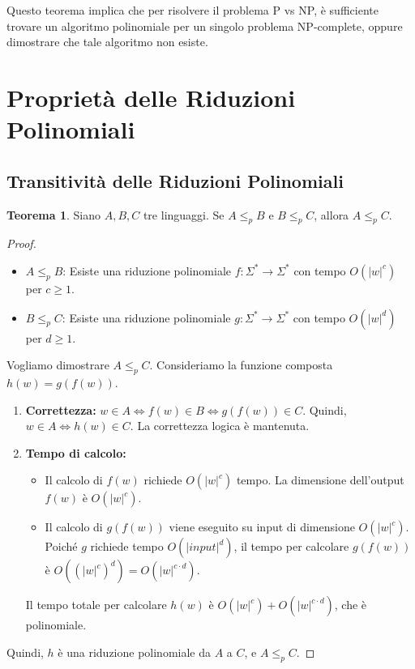 \documentclass[a4paper]{article}
\theoremstyle{definition} %
\newtheorem{theorem}{Teorema}
\begin{document}
Questo teorema implica che per risolvere il problema P vs NP, è sufficiente trovare un algoritmo polinomiale per un singolo problema NP-complete, oppure dimostrare che tale algoritmo non esiste.

\section{Proprietà delle Riduzioni Polinomiali}

\subsection{Transitivit\`a delle Riduzioni Polinomiali}

\begin{theorem}
Siano $A, B, C$ tre linguaggi. Se $A \le_p B$ e $B \le_p C$, allora $A \le_p C$.
\end{theorem}

\begin{proof}
\begin{itemize}
    \item $A \le_p B$: Esiste una riduzione polinomiale $f: \Sigma^* \to \Sigma^*$ con tempo $O(|w|^c)$ per $c \ge 1$.
    \item $B \le_p C$: Esiste una riduzione polinomiale $g: \Sigma^* \to \Sigma^*$ con tempo $O(|w|^d)$ per $d \ge 1$.
\end{itemize}
Vogliamo dimostrare $A \le_p C$.
Consideriamo la funzione composta $h(w) = g(f(w))$.
\begin{enumerate}
    \item \textbf{Correttezza:} $w \in A \iff f(w) \in B \iff g(f(w)) \in C$. Quindi, $w \in A \iff h(w) \in C$. La correttezza logica è mantenuta.
    \item \textbf{Tempo di calcolo:}
    \begin{itemize}
        \item Il calcolo di $f(w)$ richiede $O(|w|^c)$ tempo. La dimensione dell'output $f(w)$ è $O(|w|^c)$.
        \item Il calcolo di $g(f(w))$ viene eseguito su input di dimensione $O(|w|^c)$. Poiché $g$ richiede tempo $O(|input|^d)$, il tempo per calcolare $g(f(w))$ è $O((|w|^c)^d) = O(|w|^{c \cdot d})$.
    \end{itemize}
    Il tempo totale per calcolare $h(w)$ è $O(|w|^c) + O(|w|^{c \cdot d})$, che è polinomiale.
\end{enumerate}
Quindi, $h$ è una riduzione polinomiale da $A$ a $C$, e $A \le_p C$.
\end{proof}
\end{document}

